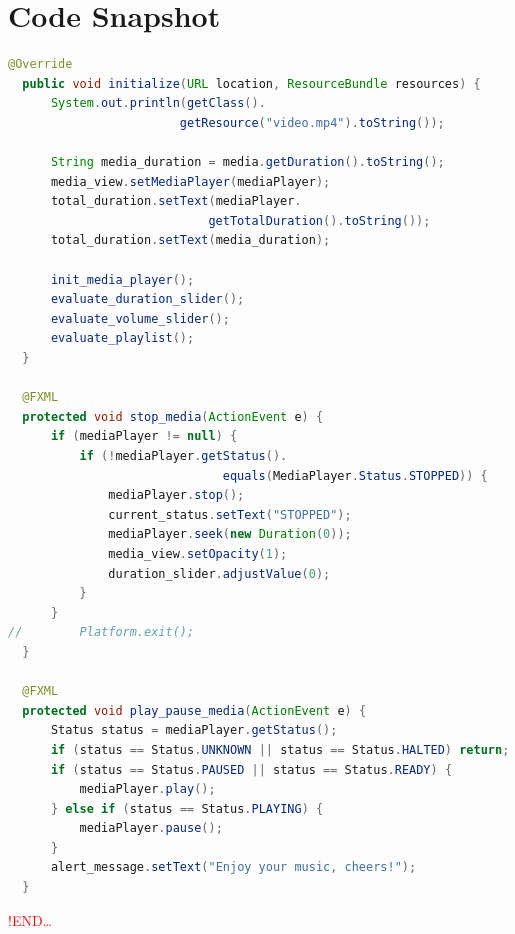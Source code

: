 \documentclass{report}
\begin{document}
\section{Code Snapshot}
\begin{lstlisting}[frame = shadowbox, rulesepcolor = \color{blue!80}, language = Java, caption = Snippet from Controller class]
  @Override
  public void initialize(URL location, ResourceBundle resources) {
      System.out.println(getClass().
                        getResource("video.mp4").toString());

      String media_duration = media.getDuration().toString();
      media_view.setMediaPlayer(mediaPlayer);
      total_duration.setText(mediaPlayer.
                            getTotalDuration().toString());
      total_duration.setText(media_duration);

      init_media_player();
      evaluate_duration_slider();
      evaluate_volume_slider();
      evaluate_playlist();
  }

  @FXML
  protected void stop_media(ActionEvent e) {
      if (mediaPlayer != null) {
          if (!mediaPlayer.getStatus().
                              equals(MediaPlayer.Status.STOPPED)) {
              mediaPlayer.stop();
              current_status.setText("STOPPED");
              mediaPlayer.seek(new Duration(0));
              media_view.setOpacity(1);
              duration_slider.adjustValue(0);
          }
      }
//        Platform.exit();
  }

  @FXML
  protected void play_pause_media(ActionEvent e) {
      Status status = mediaPlayer.getStatus();
      if (status == Status.UNKNOWN || status == Status.HALTED) return;
      if (status == Status.PAUSED || status == Status.READY) {
          mediaPlayer.play();
      } else if (status == Status.PLAYING) {
          mediaPlayer.pause();
      }
      alert_message.setText("Enjoy your music, cheers!");
  }
\end{lstlisting}

\vspace*{1.6cm}

\begin{center}
  \textcolor{red}{\LARGE !END\dots}
\end{center}
\end{document}
